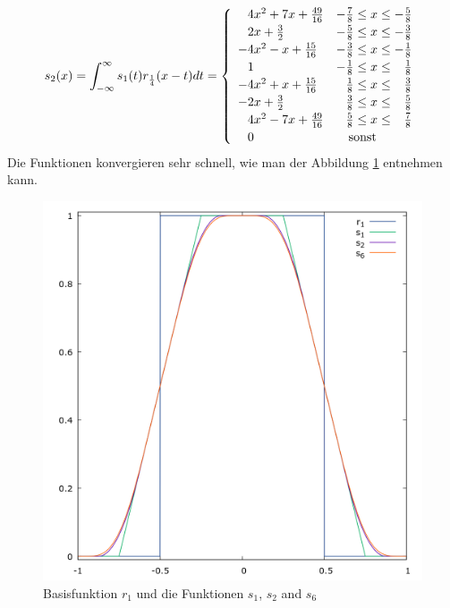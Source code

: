 \documentclass[german]{article}
\begin{document}
\[
s_2(x) = \int_{-\infty}^{\infty} s_1(t)r_\frac{1}{4}(x-t) dt = \left\{
	\begin{array}{ll}
		\hphantom{-}4x^2 + 7x + \frac{49}{16}&           - \frac{7}{8} \le x \le           - \frac{5}{8} \\[2pt]
		\hphantom{-}2x   + \frac{3}{2}       &           - \frac{5}{8} \le x \le           - \frac{3}{8} \\[2pt]
		          - 4x^2 - x + \frac{15}{16} &           - \frac{3}{8} \le x \le           - \frac{1}{8} \\[2pt]
		\hphantom{-}1                        &           - \frac{1}{8} \le x \le \hphantom{-}\frac{1}{8} \\[2pt]
		          - 4x^2 + x + \frac{15}{16} & \hphantom{-}\frac{1}{8} \le x \le \hphantom{-}\frac{3}{8} \\[2pt]
		          - 2x   + \frac{3}{2}       & \hphantom{-}\frac{3}{8} \le x \le \hphantom{-}\frac{5}{8} \\[2pt]
		\hphantom{-}4x^2 - 7x + \frac{49}{16}& \hphantom{-}\frac{5}{8} \le x \le \hphantom{-}\frac{7}{8} \\[2pt]
		\hphantom{-}0                        & \quad\mbox{sonst} 
	\end {array} 
	\right.
\]
Die Funktionen konvergieren sehr schnell, wie man der Abbildung \ref{fig:sn} entnehmen kann.

\begin{figure}
  \includegraphics[width=\linewidth]{SchnablFunction.png}
  \caption{Basisfunktion $r_1$ und die Funktionen $s_1$, $s_2$ and $s_6$}
  \label{fig:sn}
\end{figure}
\end{document}
